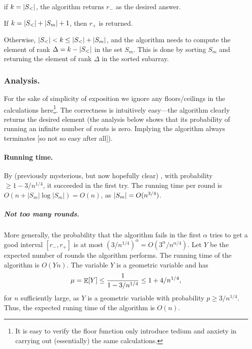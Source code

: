 \begin{compactitem}
    \smallskip%
    \item if $k = \left| {S_<} \right|$, the algorithm returns $r_-$ as the
    desired answer.

    \smallskip%
    \item If $k = \left| {S_<} \right| + \left| {S_m} \right| + 1$, then 
    $r_+$ is returned.

    \smallskip%
    \item Otherwise, $\left| {S_<} \right| < k \leq \left| {S_<} \right| + \left| {S_m} \right|$,
    and the algorithm needs to compute the element of rank
    $\Delta = k - \left| {S_<} \right|$ in the set $S_m$. This is done by sorting
    $S_m$ and returning the element of rank $\Delta$ in the sorted
    subarray.
\end{compactitem}

\subsubsection{Analysis.}

For the sake of simplicity of exposition we ignore any floors/ceilings in
the calculations here\footnote{It is easy to verify the floor function
   only introduce tedium and anxiety in carrying out (essentially) the
   same calculations.}.  The correctness is intuitively easy---the
algorithm clearly returns the desired element (the analysis below shows
that its probability of running an infinite number of routs is
zero. Implying the algorithm always terminates [so not so easy after
all]).

\paragraph*{Running time.}
By (previously mysterious, but now hopefully clear)
, with probability $\geq 1-3/n^{1 /4}$, it succeeded
in the first try.  The running time per round is
$O(n + |S_m| \log |S_m|) = O(n)$, as $\left| {S_m} \right| = O(n^{3/4})$.




\subparagraph*{Not too many rounds.}

More generally, the probability that the algorithm fails in the first
$\alpha$ tries to get a good interval $[r_{-}, r_{+}]$ is at most
$(3/n^{1/4})^\alpha = O(3^\alpha /n^{\alpha /4})$. Let $Y$ be the expected number of
rounds the algorithm performs. The running time of the algorithm is
$ O(Yn)$.  The variable $Y$ is a geometric variable and has
\begin{equation}
    \mu = \Ex{Y} \leq  \frac{1}{  1- 3/n^{1/4}} \leq 1 + 4/n^{1/4},
    \eqlab{q-s-few-rounds}
\end{equation}
for $n$ sufficiently large, as $Y$ is a geometric variable with
probability $p \geq 3/n^{1/4}$.  Thus, the expected runing time of the
algorithm is $O(n)$.

